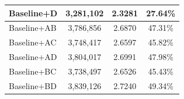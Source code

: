 \documentclass[pdflatex,sn-mathphys-num]{sn-jnl}%
\theoremstyle{thmstyleone}%
\theoremstyle{thmstyletwo}%
\theoremstyle{thmstylethree}%
\begin{document}
\begin{table}[ht]
\begin{tabular}{@{}lccc@{}}
Baseline+D             & 3,281,102                                                                                                                                                 & 2.3281                                                                                                                                                 & 27.64\% \\ \midrule %
Baseline+AB            & 3,786,856                                                                                                                                                 & 2.6870                                                                                                                                                 & 47.31\% \\ %
Baseline+AC            & 3,748,417                                                                                                                                                 & 2.6597                                                                                                                                                 & 45.82\% \\ %
Baseline+AD            & 3,804,017                                                                                                                                                 & 2.6991                                                                                                                                                 & 47.98\% \\ %
Baseline+BC            & 3,738,497                                                                                                                                                 & 2.6526                                                                                                                                                 & 45.43\% \\ %
Baseline+BD            & 3,839,126                                                                                                                                                 & 2.7240                                                                                                                                                 & 49.34\% \\ %

\end{tabular}
\end{table}
\end{document}
